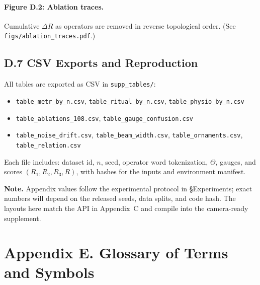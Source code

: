 \documentclass[12pt]{article}
\numberwithin{equation}{section}
\theoremstyle{plain}
\theoremstyle{definition}
\theoremstyle{remark}
\begin{document}
\paragraph{Figure D.2: Ablation traces.}
Cumulative $\Delta R$ as operators are removed in reverse topological order. (See \texttt{figs/ablation\_traces.pdf}.)

\subsection*{D.7 CSV Exports and Reproduction}
All tables are exported as CSV in \texttt{supp\_tables/}:
\begin{itemize}
\item \texttt{table\_metr\_by\_n.csv}, \texttt{table\_ritual\_by\_n.csv}, \texttt{table\_physio\_by\_n.csv}
\item \texttt{table\_ablations\_108.csv}, \texttt{table\_gauge\_confusion.csv}
\item \texttt{table\_noise\_drift.csv}, \texttt{table\_beam\_width.csv}, \texttt{table\_ornaments.csv}, \texttt{table\_relation.csv}
\end{itemize}
Each file includes: dataset id, $n$, seed, operator word tokenization, $\Theta$, gauges, and scores $(R_1,R_2,R_3,R)$, with hashes for the inputs and environment manifest.

\medskip
\noindent\textbf{Note.} Appendix values follow the experimental protocol in \S\!Experiments; exact numbers will depend on the released seeds, data splits, and code hash. The layouts here match the API in Appendix~C and compile into the camera-ready supplement.

\section*{Appendix E. Glossary of Terms and Symbols}
\end{document}
